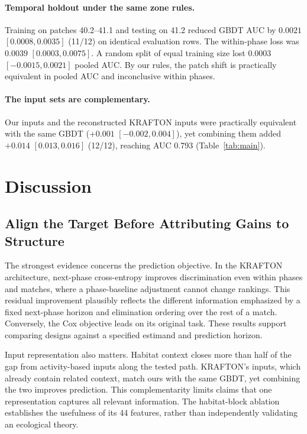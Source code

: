 \documentclass[sigconf,anonymous,nonacm]{acmart}
\begin{document}
\paragraph{Temporal holdout under the same zone rules.}
Training on patches 40.2--41.1 and testing on 41.2 reduced GBDT AUC by $0.0021$ $[0.0008, 0.0035]$ (11/12) on identical evaluation rows. The within-phase loss was $0.0039$ $[0.0003, 0.0075]$. A random split of equal training size lost $0.0003$ $[-0.0015, 0.0021]$ pooled AUC. By our rules, the patch shift is practically equivalent in pooled AUC and inconclusive within phases.
\paragraph{The input sets are complementary.}
Our inputs and the reconstructed KRAFTON inputs were practically equivalent with the same GBDT ($+0.001$ $[-0.002, 0.004]$), yet combining them added $+0.014$ $[0.013, 0.016]$ (12/12), reaching AUC 0.793 (Table~\ref{tab:main}).

\section{Discussion}
\label{sec:discussion}
\subsection{Align the Target Before Attributing Gains to Structure}
\label{sec:discussion:drivers}
The strongest evidence concerns the prediction objective. In the KRAFTON architecture, next-phase cross-entropy improves discrimination even within phases and matches, where a phase-baseline adjustment cannot change rankings. This residual improvement plausibly reflects the different information emphasized by a fixed next-phase horizon and elimination ordering over the rest of a match. Conversely, the Cox objective leads on its original task. These results support comparing designs against a specified estimand and prediction horizon.

Input representation also matters. Habitat context closes more than half of the gap from activity-based inputs along the tested path. KRAFTON's inputs, which already contain related context, match ours with the same GBDT, yet combining the two improves prediction. This complementarity limits claims that one representation captures all relevant information. The habitat-block ablation establishes the usefulness of its 44 features, rather than independently validating an ecological theory.
\end{document}
